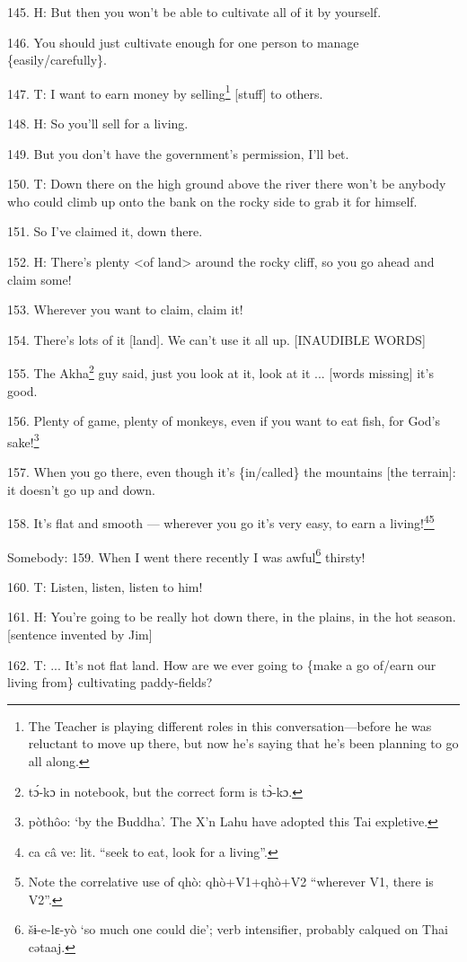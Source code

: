 145. H: But then you won't be able to cultivate all of it by yourself.

146. You should just cultivate enough for one person to manage \{easily/carefully\}.

147. T: I want to earn money by selling\footnote{The Teacher is playing different roles in this conversation---before he was reluctant to move up there, but now he's saying that he's been planning to go all along.} [stuff] to others.

148. H: So you'll sell for a living.

149. But you don't have the government's permission, I'll bet.

150. T: Down there on the high ground above the river there won't be anybody who
could climb up onto the bank on the rocky side to grab it for himself.

151. So I've claimed it, down there.

152. H: There's plenty <of land> around the rocky cliff, so you
go ahead and claim some!

153. Wherever you want to claim, claim it!

154. There's lots of it [land]. We can't use it all up. [INAUDIBLE WORDS]

155. The Akha\footnote{tɔ́-kɔ in notebook, but the correct form is tɔ̀-kɔ.} guy said, just you look at it, look at it ... [words missing]
it's good.

156. Plenty of game, plenty of monkeys, even if you want to eat fish, for God's
sake!\footnote{pòthôo: `by the Buddha'. The X'n Lahu have adopted this Tai expletive.}

157. When you go there, even though it's \{in/called\} the mountains [the terrain]:
it doesn't go up and down.

158. It's flat and smooth --- wherever you go it's very easy, to earn a living!\footnote{ca câ ve: lit. ``seek to eat, look for a living''.}\footnote{Note the correlative use of qhò: qhò+V1+qhò+V2 ``wherever V1, there is V2''.}

Somebody: 159. When I went there recently I was awful\footnote{šɨ-e-lɛ-yò `so much one could die'; verb intensifier, probably calqued on Thai cətaaj.} thirsty!

160. T: Listen, listen, listen to him!

161. H: You're going to be really hot down there, in the plains, in the hot season.
[sentence invented by Jim]

162. T: ... It's not flat land. How are we ever going to \{make a go of/earn our
living from\} cultivating paddy-fields?

